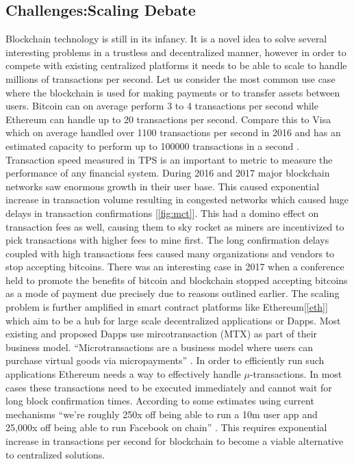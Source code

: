 \subsection{Challenges:Scaling Debate}\label{scaling}
Blockchain technology is still in its infancy. It is a novel idea to solve several interesting problems in a trustless and decentralized manner, however in order to compete with existing centralized platforms it needs to be able to scale to handle millions of transactions per second. Let us consider the most common use case where the blockchain is used for making payments or to transfer assets between users. Bitcoin can on average perform 3 to 4 transactions per second while Ethereum can handle up to 20 transactions per second. Compare this to Visa which on average handled over 1100 transactions per second in 2016 and has an estimated capacity to perform up to 100000 transactions in a second \cite{medium:003}. Transaction speed measured in TPS is an important to metric to measure the performance of any financial system. During 2016 and 2017 major blockchain networks saw enormous growth in their user base. This caused exponential increase in transaction volume resulting in congested networks which caused huge delays in transaction confirmations [\ref{fig:mct}]. This had a domino effect on transaction fees as well, causing them to sky rocket as miners are incentivized to pick transactions with higher fees to mine first. The long confirmation delays coupled with high transactions fees caused many organizations and vendors to stop accepting bitcoins. There was an interesting case in 2017 when a conference held to promote the benefits of bitcoin and blockchain stopped accepting bitcoins as a mode of payment due precisely due to reasons outlined earlier.  The scaling problem is further amplified in smart contract platforms like Ethereum[\ref{eth}] which aim to be a hub for large scale decentralized applications or Dapps. Most existing and proposed Dapps use mircotransaction (MTX) as part of their business model. “Microtransactions are a business model where users can purchase virtual goods via micropayments” \cite{wiki:007}. In order to efficiently run such applications Ethereum needs a way to effectively handle $\mu$-transactions. In most cases these transactions need to be executed immediately and cannot wait for long block confirmation times. According to some estimates using current mechanisms “we’re roughly 250x off being able to run a 10m user app and 25,000x off being able to run Facebook on chain” \cite{medium:003}.  This requires exponential increase in transactions per second for blockchain to become a viable alternative to centralized solutions.
